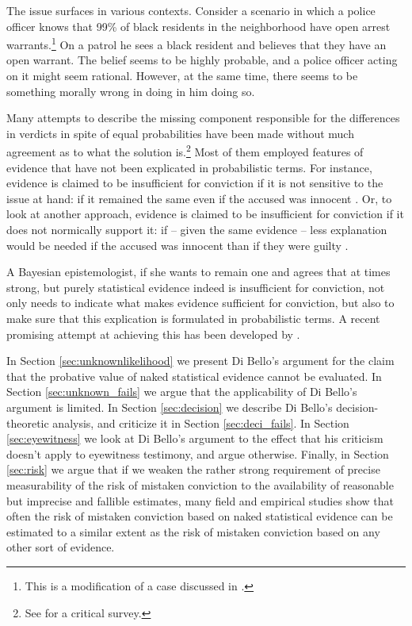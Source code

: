 \documentclass{article}
\begin{document}
The issue surfaces in various contexts.   Consider a scenario 
 in which a police officer knows that 99\% of black residents in the neighborhood have open arrest warrants.\footnote{This is a modification of a case discussed in \citep{BasuForthcoming-BASTWO-3}.} On a patrol he sees a black resident and believes that they have an open warrant. The belief seems to be highly probable, and a police officer acting on it might seem rational. However, at the same time, there seems to be something morally wrong in doing in him doing so.  




Many attempts to describe the missing component  responsible for the differences in verdicts in spite of equal probabilities have been made without much agreement as to what the solution is.\footnote{See \citep{redmayne2008exploring} for a critical survey.} Most of them employed features of evidence that have not been explicated in probabilistic terms. For   instance,  evidence is claimed to be insufficient for conviction if it is not sensitive to the issue at hand: if it remained the same even if the accused was innocent \citep{enoch2015sense}. Or, to look at another approach,  evidence is claimed to be insufficient for conviction if it does not normically support it: if -- given the same evidence -- less explanation would be needed  if the accused was innocent than if they were guilty \citep{Smith2018_evidence}. 

  A Bayesian epistemologist, if she wants to remain one and agrees that at times strong, but purely statistical evidence indeed is insufficient for conviction, not only needs to indicate what makes evidence sufficient for conviction, but also to make sure that this explication is formulated in probabilistic terms. A recent promising attempt at achieving this has been developed by \citet{dibello2019TrialStatisticsHigh}. 



In Section \ref{sec:unknownlikelihood} we present Di Bello's argument for the claim that the probative value of naked statistical evidence cannot be evaluated. In Section \ref{sec:unknown_fails} we argue that the applicability of Di Bello's argument is limited.  
In Section \ref{sec:decision} we describe Di Bello's decision-theoretic analysis, and criticize it in Section \ref{sec:deci_fails}. In Section \ref{sec:eyewitness} we look at Di Bello's argument to the effect that his criticism doesn't apply to eyewitness testimony, and  argue otherwise. Finally, in Section \ref{sec:risk} we argue that if  we weaken the rather strong requirement of precise measurability  of the risk of mistaken conviction to the availability of reasonable but imprecise and fallible estimates,  many field and empirical studies show that often the risk of mistaken conviction based on naked statistical evidence can be estimated to a similar extent as the risk of mistaken conviction based on any  other sort of evidence.  
\end{document}
